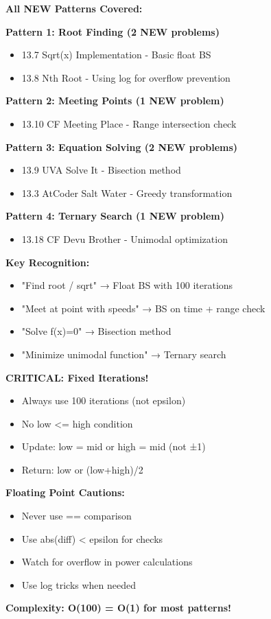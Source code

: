 \documentclass[11pt,a4paper,oneside]{book}
\begin{document}
\begin{tcolorbox}[
    enhanced,breakable,
    colback=primaryblue!10,
    colframe=primaryblue,
    boxrule=2pt,
    arc=4mm,
    title=\textbf{Floating Point BS: Complete Mastery}
]
\textbf{All NEW Patterns Covered:}

\textbf{Pattern 1: Root Finding (2 NEW problems)}
\begin{itemize}
\item 13.7 Sqrt(x) Implementation - Basic float BS
\item 13.8 Nth Root - Using log for overflow prevention
\end{itemize}

\textbf{Pattern 2: Meeting Points (1 NEW problem)}
\begin{itemize}
\item 13.10 CF Meeting Place - Range intersection check
\end{itemize}

\textbf{Pattern 3: Equation Solving (2 NEW problems)}
\begin{itemize}
\item 13.9 UVA Solve It - Bisection method
\item 13.3 AtCoder Salt Water - Greedy transformation
\end{itemize}

\textbf{Pattern 4: Ternary Search (1 NEW problem)}
\begin{itemize}
\item 13.18 CF Devu Brother - Unimodal optimization
\end{itemize}

\textbf{Key Recognition:}
\begin{itemize}
\item "Find root / sqrt" → Float BS with 100 iterations
\item "Meet at point with speeds" → BS on time + range check
\item "Solve f(x)=0" → Bisection method
\item "Minimize unimodal function" → Ternary search
\end{itemize}

\textbf{CRITICAL: Fixed Iterations!}
\begin{itemize}
\item Always use 100 iterations (not epsilon)
\item No low <= high condition
\item Update: low = mid or high = mid (not ±1)
\item Return: low or (low+high)/2
\end{itemize}

\textbf{Floating Point Cautions:}
\begin{itemize}
\item Never use == comparison
\item Use abs(diff) < epsilon for checks
\item Watch for overflow in power calculations
\item Use log tricks when needed
\end{itemize}

\textbf{Complexity: O(100) = O(1) for most patterns!}
\end{tcolorbox}
\end{document}
